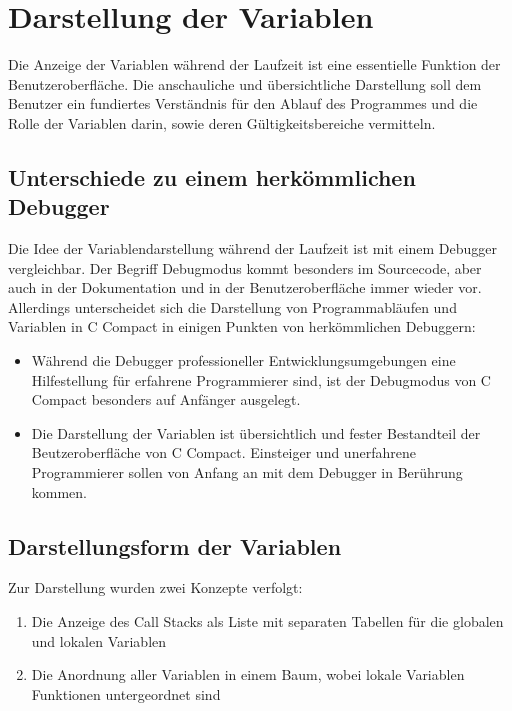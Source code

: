 \chapter{Darstellung der Variablen}

Die Anzeige der Variablen während der Laufzeit ist eine essentielle Funktion der Benutzeroberfläche. Die anschauliche und übersichtliche Darstellung soll dem Benutzer ein fundiertes Verständnis für den Ablauf des Programmes und die Rolle der Variablen darin, sowie deren Gültigkeitsbereiche vermitteln.

\section{Unterschiede zu einem herkömmlichen Debugger}
Die Idee der Variablendarstellung während der Laufzeit ist mit einem Debugger vergleichbar. Der Begriff Debugmodus kommt besonders im Sourcecode, aber auch in der Dokumentation und in der Benutzeroberfläche immer wieder vor. Allerdings unterscheidet sich die Darstellung von Programmabläufen und Variablen in C Compact in einigen Punkten von herkömmlichen Debuggern:
\begin{itemize}
\item Während die Debugger professioneller Entwicklungsumgebungen eine Hilfestellung für erfahrene Programmierer sind, ist der Debugmodus von C Compact besonders auf Anfänger ausgelegt.
\item Die Darstellung der Variablen ist übersichtlich und fester Bestandteil der Beutzeroberfläche von C Compact. Einsteiger und unerfahrene Programmierer sollen von Anfang an mit dem Debugger in Berührung kommen.
\end{itemize}

\section{Darstellungsform der Variablen}

Zur Darstellung wurden zwei Konzepte verfolgt:
\begin{enumerate}
\item Die Anzeige des Call Stacks als Liste mit separaten Tabellen für die globalen und lokalen Variablen
\item Die Anordnung aller Variablen in einem Baum, wobei lokale Variablen Funktionen untergeordnet sind
\end{enumerate}

